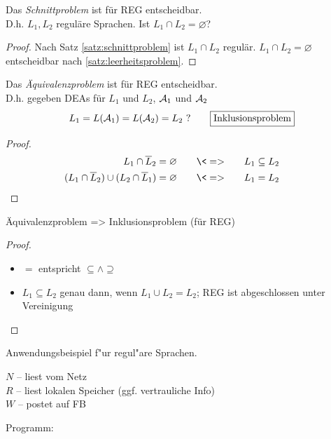 \begin{Satz}[name={[Schnittproblem]}]\label{satz:schnittproblem}
        Das \emph{Schnittproblem} ist für REG entscheidbar.\\
        D.h. $L_1,L_2$ reguläre Sprachen. Ist $L_1\cap L_2 = \varnothing$?
\end{Satz}
\begin{proof}
        Nach Satz \ref{satz:schnittproblem} ist $L_1\cap L_2$ regulär. $L_1\cap L_2=\varnothing$ entscheidbar nach \autoref{satz:leerheitsproblem}.
\end{proof}

\begin{Satz}[name={[Äquivalenzproblem]}]\label{satz:äquivalenzproblem}
	Das \emph{Äquivalenzproblem} ist für REG entscheidbar.\\
	D.h. gegeben \ac{DEA}s für $L_1$ und $L_2$, $\mathcal{A}_1$ und $\mathcal{A}_2$
	\[ L_1 = L(\A_1) = L(\A_2) = L_2\ ? \qquad \framebox{Inklusionsproblem}\]
\end{Satz}
\vspace{-2em}
\begin{proof}
        \begin{alignat*}{3}
                L_1\cap \overline{L}_2 &= \varnothing &\quad&\<=>\quad & L_1 &\subseteq L_2\\
                (L_1\cap\overline{L}_2)\cup(L_2\cap \overline{L}_1) &= \varnothing &&\<=> & L_1 &= L_2 \tag*{\qedhere}
        \end{alignat*}
\end{proof}

\begin{Satz}[name={[Inklusionsproblem]}] Äquivalenzproblem \<=> Inklusionsproblem (für REG)
\end{Satz}
\begin{proof}
\begin{itemize}
\item  $=$ entspricht $\subseteq\land\supseteq$
\item $L_1 \subseteq L_2$ genau dann, wenn $L_1 \cup L_2 = L_2$; REG ist abgeschlossen unter Vereinigung
\end{itemize}
\end{proof}


Anwendungsbeispiel f"ur regul"are Sprachen.

$N$ -- liest vom Netz\\
$R$ -- liest lokalen Speicher (ggf. vertrauliche Info)\\
$W$ -- postet auf FB

Programm:

